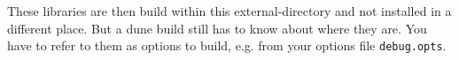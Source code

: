 These libraries are then build within this external-directory and not installed in 
a different place. But a dune build still  has to know about where they are.
You have to refer to them as options to \Dune build, e.g. from your options file \texttt{debug.opts}.


% 
% 
% 
